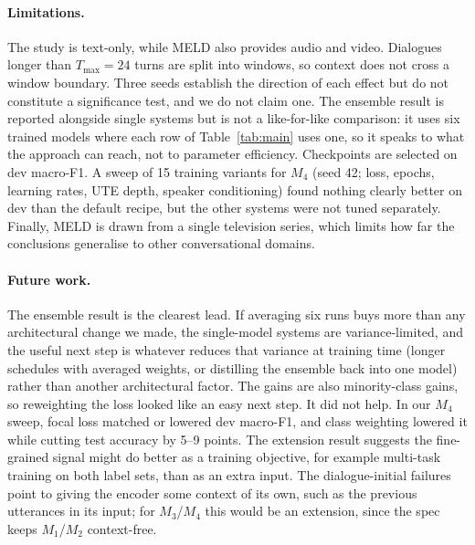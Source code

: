\documentclass[sigconf,nonacm]{acmart}
\begin{document}
\paragraph{Limitations.}
The study is text-only, while MELD also provides audio and video. Dialogues longer than
$T_{\max} = 24$ turns are split into windows, so context does not cross a window boundary.
Three seeds establish the direction of each effect but do not constitute a significance
test, and we do not claim one. The ensemble result is reported alongside single systems but
is not a like-for-like comparison: it uses six trained models where each row of
Table~\ref{tab:main} uses one, so it speaks to what the approach can reach, not to parameter
efficiency. Checkpoints are selected on dev macro-F1. A sweep of 15
training variants for $M_4$ (seed 42; loss, epochs, learning rates, UTE depth, speaker
conditioning) found nothing clearly better on dev than the default recipe, but the other
systems were not tuned separately. Finally, MELD is drawn from a single television series, which limits how far the
conclusions generalise to other conversational domains.

\paragraph{Future work.}
The ensemble result is the clearest lead. If averaging six runs buys more than any
architectural change we made, the single-model systems are variance-limited, and the useful
next step is whatever reduces that variance at training time (longer schedules with
averaged weights, or distilling the ensemble back into one model) rather than another
architectural factor. The gains are also minority-class gains, so reweighting the loss
looked like an easy next step. It did not help. In our $M_4$ sweep, focal loss matched or lowered dev macro-F1, and
class weighting lowered it while cutting test accuracy by 5--9 points. The extension result suggests the
fine-grained signal might do better as a training objective, for example multi-task
training on both label sets, than as an extra input. The dialogue-initial failures point
to giving the encoder some context of its own, such as the previous utterances in its
input; for $M_3$/$M_4$ this would be an extension, since the spec keeps $M_1$/$M_2$
context-free.

\balance


\end{document}

